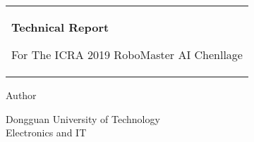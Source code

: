 \begin{titlepage}


\noindent
\begin{tabular}{@{}p{\textwidth}@{}}
	\vspace{0.2cm}
	\begin{center}
		\Huge{\textbf{Technical Report}}
	\end{center}

	\begin{center}
		\Large{For The ICRA 2019 RoboMaster AI Chenllage}
	\end{center}
	
	\vspace{0.2cm}\\
\end{tabular}

\vspace{4 cm}
\begin{center}{\large Author}\\
	\vspace{0.2cm}{\Large Yi-Kang Gu}

	\vspace{0.2cm}{\Large Zhao-Yi Meng}

\end{center}

\vfill
\begin{center}
  Dongguan University of Technology\\
  Electronics and IT
\end{center}


\end{titlepage}
\clearpage